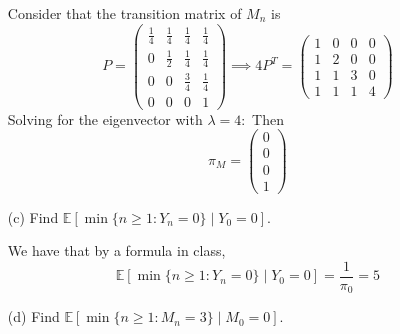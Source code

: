 \documentclass[11pt]{article}
\begin{document}
\begin{enumerate}
\begin{solution}
    Consider that the transition matrix of $M_n$ is 
    \[P = \begin{pmatrix}
        \frac{1}{4} & \frac{1}{4} & \frac{1}{4} & \frac{1}{4}\\
        0 & \frac{1}{2} & \frac{1}{4} & \frac{1}{4}\\
        0 & 0 & \frac{3}{4} & \frac{1}{4}\\
        0 & 0 & 0  & 1
    \end{pmatrix} \implies 4P^T =\begin{pmatrix}
        1 & 0 & 0 & 0\\
        1 & 2 & 0 & 0\\
        1 & 1 & 3 & 0\\
        1 & 1 & 1 & 4
    \end{pmatrix}\] Solving for the eigenvector with $\lambda = 4:$
    Then \[\boxed{\pi_M = \begin{pmatrix}
        0 \\ 0 \\ 0 \\ 1
    \end{pmatrix}}\]
\end{solution}

    \item[(c)] Find $\mathbb{E}[\min\{n \geq 1 : Y_n = 0\} \mid Y_0 = 0]$.
\begin{solution}
    We have that by  a formula in class,
    \[\boxed{\mathbb{E}[\min\{n \geq 1 : Y_n = 0\} \mid Y_0 = 0] = \frac{1}{\pi_0} = 5}\]
\end{solution}

    \item[(d)] Find $\mathbb{E}[\min\{n \geq 1 : M_n = 3\} \mid M_0 = 0]$.


\end{enumerate}
\end{document}
